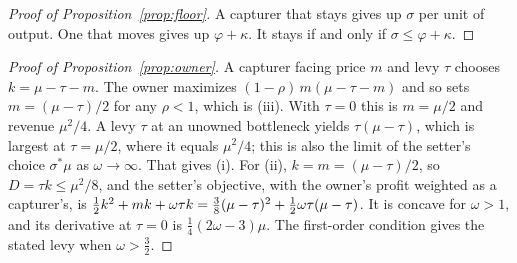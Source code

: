 \begin{proof}[Proof of Proposition~\ref{prop:floor}]
A capturer that stays gives up $\sigma$ per unit of output. One that moves gives up
$\varphi+\kappa$. It stays if and only if $\sigma\le\varphi+\kappa$.
\end{proof}

\begin{proof}[Proof of Proposition~\ref{prop:owner}]
A capturer facing price $m$ and levy $\tau$ chooses $k=\mu-\tau-m$. The owner maximizes
$(1-\rho)\,m(\mu-\tau-m)$ and so sets $m=(\mu-\tau)/2$ for any $\rho<1$, which is (iii).
With $\tau=0$ this is $m=\mu/2$ and revenue $\mu^2/4$. A levy $\tau$ at an unowned
bottleneck yields $\tau(\mu-\tau)$, which is largest at $\tau=\mu/2$, where it equals
$\mu^2/4$; this is also the limit of the setter's choice $\sigma^*\mu$ as
$\omega\to\infty$. That gives (i). For (ii), $k=m=(\mu-\tau)/2$, so $D=\tau k\le\mu^2/8$,
and the setter's objective, with the owner's profit weighted as a capturer's, is
$\tfrac{1}{2} k^2+mk+\omega\tau k=\tfrac38(\mu-\tau)^2+\tfrac{1}{2}\omega\tau(\mu-\tau)$. It is concave
for $\omega>1$, and its derivative at $\tau=0$ is $\tfrac14(2\omega-3)\mu$. The
first-order condition gives the stated levy when $\omega>\frac32$.
\end{proof}





